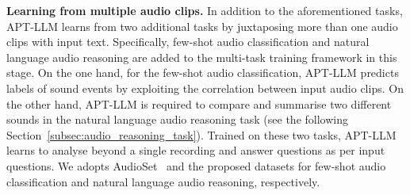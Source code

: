 \documentclass{article} %
\begin{document}
\textbf{Learning from multiple audio clips.}
In addition to the aforementioned tasks, APT-LLM learns from two additional tasks by juxtaposing more than one audio clips with input text. Specifically, few-shot audio classification and natural language audio reasoning are added to the multi-task training framework in this stage. On the one hand, for the few-shot audio classification, APT-LLM predicts labels of sound events by exploiting the correlation between input audio clips. On the other hand, APT-LLM is required to compare and summarise two different sounds in the natural language audio reasoning task (see the following Section~\ref{subsec:audio_reasoning_task}). Trained on these two tasks, APT-LLM learns to analyse beyond a single recording and answer questions as per input questions. We adopts AudioSet~\citep{gemmeke_audio_2017} and the proposed datasets for few-shot audio classification and natural language audio reasoning, respectively.

\end{document}
